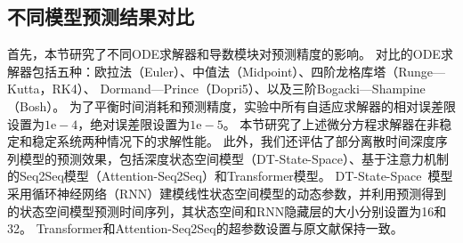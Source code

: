 \subsection{不同模型预测结果对比}
首先，本节研究了不同ODE求解器和导数模块对预测精度的影响。
对比的ODE求解器包括五种：欧拉法（Euler）、中值法（Midpoint）、四阶龙格库塔（Runge—Kutta，RK4）、 Dormand—Prince（Dopri5）\cite{NIPS2018_7892}、以及三阶Bogacki—Shampine（Bosh）\cite{bogacki19893}。
为了平衡时间消耗和预测精度，实验中所有自适应求解器的相对误差限设置为$1\mathrm{e}-4$，绝对误差限设置为$1\mathrm{e}-5$。
本节研究了上述微分方程求解器在非稳定和稳定系统两种情况下的求解性能。
此外，我们还评估了部分离散时间深度序列模型的预测效果，包括深度状态空间模型（DT-State-Space）、基于注意力机制的Seq2Seq模型（Attention-Seq2Seq）\cite{Member2019}和Transformer模型\cite{Wu2020}。
DT-State-Space~\cite{Rangapuram2018}模型采用循环神经网络（RNN）建模线性状态空间模型的动态参数，并利用预测得到的状态空间模型预测时间序列，其状态空间和RNN隐藏层的大小分别设置为16和32。
Transformer和Attention-Seq2Seq的超参数设置与原文献保持一致。

